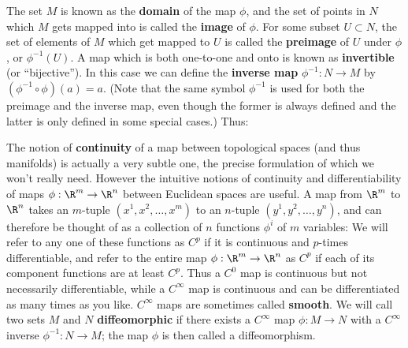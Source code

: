 \begin{figure}
  \centerline{
  }
\end{figure}

The set $M$ is known as the {\bf domain}
of the map $\phi$, and the set of points in $N$ which $M$ gets mapped into
is called the {\bf image} of $\phi$.  For some subset $U\subset N$,
the set of elements of $M$ which get mapped to $U$ is called the
{\bf preimage} of $U$ under $\phi$, or $\phi^{-1}(U)$.  A map which
is both one-to-one and onto is known as {\bf invertible} (or 
``bijective'').  In this case we can define the {\bf inverse map}
$\phi^{-1}:N\rightarrow M$ by $(\phi^{-1}\circ\phi)(a)=a$.  (Note that
the same symbol $\phi^{-1}$ is used for both the preimage and the inverse
map, even though the former is always defined and the latter is
only defined in some special cases.)  Thus:

\begin{figure}[h]
  \centerline{
  }
\end{figure}

The notion of {\bf continuity} of a map between topological spaces (and 
thus manifolds) is actually a very subtle one, the precise formulation of
which we won't really
need.  However the intuitive notions of continuity and differentiability
of maps $\phi:\R^m\rightarrow\R^n$ between Euclidean spaces are useful.
A map from $\R^m$ to $\R^n$ takes an $m$-tuple $(x^1,x^2,\ldots,x^m)$
to an $n$-tuple $(y^1,y^2,\ldots,y^n)$, and can therefore
be thought of as a collection of $n$ functions $\phi^i$ of $m$ variables:
\be
  \label{2.1}
\ee
We will refer to any one of these functions as $C^p$ if it is continuous 
and $p$-times differentiable, and refer to the entire map 
$\phi:\R^m\rightarrow\R^n$ as $C^p$ if each of its component functions
are at least $C^p$.  Thus a $C^0$ map is continuous but not 
necessarily differentiable,
while a $C^\infty$ map is continuous and can be differentiated as many
times as you like.  $C^\infty$ maps are sometimes called {\bf smooth}.
We will call two sets $M$ and $N$ {\bf diffeomorphic} if there exists
a $C^\infty$ map $\phi:M\rightarrow N$ with a $C^\infty$ inverse 
$\phi^{-1}:N\rightarrow M$; the map $\phi$ is then called a diffeomorphism.

